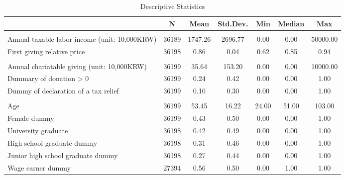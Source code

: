 \documentclass[
  11pt,
  a4paper,
]{article}
\begin{document}
\begin{table}

\caption{\label{tab:SummaryCovariate}Descriptive Statistics}
\centering
\fontsize{9}{11}\selectfont
\begin{tabular}[t]{lcccccc}
\toprule
  & N & Mean & Std.Dev. & Min & Median & Max\\
\midrule
\addlinespace[0.3em]
\multicolumn{7}{l}{\textbf{Income and giving price}}\\
\hspace{1em}Annual taxable labor income (unit: 10,000KRW) & 36189 & \num{1747.26} & \num{2696.77} & \num{0.00} & \num{0.00} & \num{50000.00}\\
\hspace{1em}First giving relative price & 36198 & \num{0.86} & \num{0.04} & \num{0.62} & \num{0.85} & \num{0.94}\\
\addlinespace[0.3em]
\multicolumn{7}{l}{\textbf{Charitable giving}}\\
\hspace{1em}Annual chariatable giving (unit: 10,000KRW) & 36199 & \num{35.64} & \num{153.20} & \num{0.00} & \num{0.00} & \num{10000.00}\\
\hspace{1em}Dummary of donation > 0 & 36199 & \num{0.24} & \num{0.42} & \num{0.00} & \num{0.00} & \num{1.00}\\
\hspace{1em}Dummy of declaration of a tax relief & 36199 & \num{0.10} & \num{0.30} & \num{0.00} & \num{0.00} & \num{1.00}\\
\addlinespace[0.3em]
\multicolumn{7}{l}{\textbf{Individual Characteristics}}\\
\hspace{1em}Age & 36199 & \num{53.45} & \num{16.22} & \num{24.00} & \num{51.00} & \num{103.00}\\
\hspace{1em}Female dummy & 36199 & \num{0.43} & \num{0.50} & \num{0.00} & \num{0.00} & \num{1.00}\\
\hspace{1em}University graduate & 36198 & \num{0.42} & \num{0.49} & \num{0.00} & \num{0.00} & \num{1.00}\\
\hspace{1em}High school graduate dummy & 36198 & \num{0.31} & \num{0.46} & \num{0.00} & \num{0.00} & \num{1.00}\\
\hspace{1em}Junior high school graduate dummy & 36198 & \num{0.27} & \num{0.44} & \num{0.00} & \num{0.00} & \num{1.00}\\
\hspace{1em}Wage earner dummy & 27394 & \num{0.56} & \num{0.50} & \num{0.00} & \num{1.00} & \num{1.00}\\
\bottomrule
\end{tabular}
\end{table}
\end{document}
